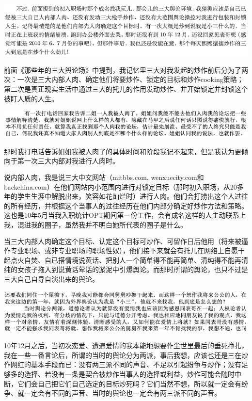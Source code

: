 \documentclass[9pt, b5paper]{article}
\begin{document}
\begin{center}
\includegraphics[width=.9\linewidth]{./pic/pfp60.png}
\end{center}

前面《那些年的三大舆论场》中提到，我记忆里三大对我发起的炒作前后分为了两次：一次是三大内部人肉、确定他们将要炒作、锁定的目标和炒作cooking策略；第二次是真正现实生活中通过三大的托儿的作用发动炒作、并开始锁定并封锁这个被盯人质的人生。

\begin{center}
\includegraphics[width=.9\linewidth]{./pic/p1p51-2.png}
\end{center}

那时我打电话告诉姐姐我被人肉了的具体时间和阶段我记不起来，但是我认为更倾向于第一次三大内部对我进行人肉时。

说内部人肉，我是说三大中文网站（mitbbs.com, wenxuecity.com和backchina.com）在他们网站内小范围内进行对锁定目标（那时初入职场，从20多年的学生生涯中解脱出来，笑容如花灿烂时）进行人肉。他们会打捞出这个人过往的所有经历，并根据这个当事人的过往经历在他们内部分确定好炒作方法和策略。这也是10年5月当我入职统计OPT期间第一份工作，会有成名这样的人主动联系上我，混进我的圈子，虽然我并不明白她所代表的圈子是什么。 

当三大内部人肉确定这个目标、认定这个目标可炒作、可留作日后他用（将来被逼作专业职场、或非专业职场的职场性奴），他们接下来就会有托儿在网络上自愿干起点火自焚、自已搭情境说黄话、把别人一个简单得不能再简单、清纯得不能再清纯的女孩子拖入到说黄话荤话的淤泥中引爆舆论。而那时所谓的舆论，也只不过是三大自己自导自演出来的舆论。

\begin{center}
\includegraphics[width=.9\linewidth]{./pic/p1p48-1.png}
\end{center}

10年12月之后，当初次恋爱、遭遇爱情的我本能地想要作尘世里最后的垂死挣扎，我在一些一番言论后，所谓的当时的舆论分为两派，事后我想，应该也还是三在炒作网红的基本手段而已：没有两三派不同的声音、不足以引起纷争与炒作；没有足够多的选择、若没有一条是契合被炒作当事人的选择或利益，炒作可能会随时中断，它们会自己把它们自己选定的目标炒死吗？它们当然不想，所以就一定会有纷争、就一定会有不同的声音、当时的舆论也一定会有两三派不同的声音。
\end{document}
